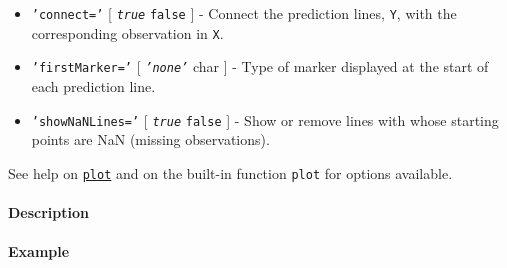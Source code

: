 \begin{itemize}
\item
  \texttt{'connect='} {[} \emph{\texttt{true}} \textbar{} \texttt{false}
  {]} - Connect the prediction lines, \texttt{Y}, with the corresponding
  observation in \texttt{X}.
\item
  \texttt{'firstMarker='} {[} \emph{\texttt{'none'}} \textbar{} char {]}
  - Type of marker displayed at the start of each prediction line.
\item
  \texttt{'showNaNLines='} {[} \emph{\texttt{true}} \textbar{}
  \texttt{false} {]} - Show or remove lines with whose starting points
  are NaN (missing observations).
\end{itemize}

See help on \href{tseries/plot}{\texttt{plot}} and on the built-in
function \texttt{plot} for options available.

\paragraph{Description}

\paragraph{Example}


